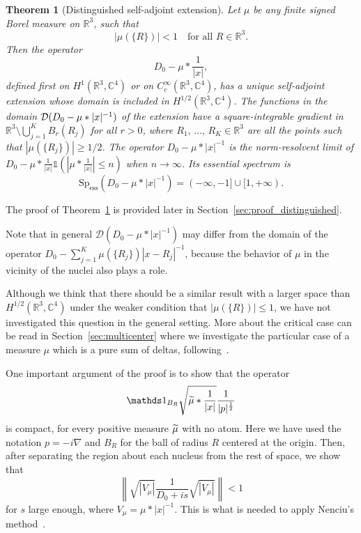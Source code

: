\documentclass[10pt]{amsart}
\newtheorem{theo}[cdrthm]{Theorem}
\theoremstyle{definition}
\newcommand{\R}{\mathbb{R}}
\newcommand{\C}{\mathbb{C}}
\newcommand{\cD}{\mathcal{D}}
\newcommand{\Spec}{\mathrm{Sp}}
\DeclareMathOperator{\ess}{ess}
\newcommand\1{{\ensuremath {\mathds 1} }}
\newcommand{\ii}{\infty}
\newcommand{\norm}[1]{ \left\| #1 \right\|}
\renewcommand{\geq}{\geqslant}
\renewcommand{\leq}{\leqslant}
\renewcommand{\tilde}{\widetilde}
\let\oldtilde\tilde
\renewcommand*{\tilde}[1]{\mathchoice{\widetilde{#1}}{\widetilde{#1}}{\oldtilde{#1}}{\oldtilde{#1}}}
\begin{document}
\begin{theo}[Distinguished self-adjoint extension]\label{thm:distinguished}
Let $\mu$ be any finite signed Borel measure on $\R^3$, such that
\[
\left|\mu(\{R\})\right|<1\quad \text{for all }R\in\R^3.
\]
Then the operator
\[
D_0-\mu\ast\frac{1}{|x|},
\]
defined first on $H^1(\R^3,\C^4)$ or on $C^\ii_c(\R^3,\C^4)$, has a unique self-adjoint extension whose domain is included in $H^{1/2}(\R^3,\C^4)$. The functions in the domain $\cD(D_0-\linebreak\mu\ast|x|^{-1})$ of the extension have a square-integrable gradient in $\R^3\setminus\bigcup_{j=1}^KB_r(R_j)$ for all $r>0$, where $R_1,\,\dots,\,R_K\in\R^3$ are all the points such that $|\mu(\{R_j\})|\geq1/2$. The operator $D_0-\mu\ast|x|^{-1}$ is the norm-resolvent limit of $D_0-\mu\ast\frac{1}{|x|}\1(|\mu\ast\frac{1}{|x|}|\leq n)$ when $n\to\ii$. Its essential spectrum is
\[
\Spec_{\ess}\left(D_0-\mu\ast|x|^{-1}\right)=(-\ii,-1]\cup[1,+\ii).
\]
\end{theo}


The proof of Theorem~\ref{thm:distinguished} is provided later in Section~\ref{sec:proof_distinguished}.
\vspace{3pt}

Note that in general $\cD(D_0-\mu\ast|x|^{-1})$ may differ from the domain of the operator $D_0-\sum_{j=1}^K\mu(\{R_j\})|x-R_j|^{-1}$, because the behavior of $\mu$ in the vicinity of the nuclei also plays a role.

Although we think that there should be a similar result with a larger space than $H^{1/2}(\R^3,\C^4)$ under the weaker condition that $|\mu(\{R\})|\leq 1$, we have not investigated this question in the general setting. More about the critical case can be read in Section~\ref{sec:multicenter} where we investigate the particular case of a measure $\mu$ which is a pure sum of deltas, following~\cite{EstLewSer-19}.

\vspace{3pt}

One important argument of the proof is to show that the operator
\[
\1_{B_R}\sqrt{\tilde\mu\ast\frac1{|x|}}\frac{1}{|p|^{\frac12}}
\]
is compact, for every positive measure $\tilde\mu$ with no atom. Here we have used the notation $p=-i\nabla$ and $B_R$ for the ball of radius $R$ centered at the origin. Then, after separating the region about each nucleus from the rest of space, we show that
\[
\norm{\sqrt{\left|V_\mu\right|}\frac1{D_0+is}\sqrt{\left|V_\mu\right|}}<1
\]
for $s$ large enough, where $V_\mu=\mu\ast|x|^{-1}$. This is what is needed to apply Nenciu's method~\cite[Corollary~2.1]{Nenciu-76}.
\end{document}
